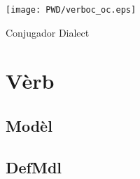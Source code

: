 \documentclass[10pt,a4paper,final]{article}
\author{Òsca-Font dubèrta}
\begin{document}
\begin{center}
\texttt{[image: PWD/verboc\_oc.eps]}
\end{center}

\begin{center}
\huge{Conjugador Dialect}
\end{center}

\section*{Vèrb}
\subsection*{Modèl}
\subsection*{DefMdl}
\end{document}
